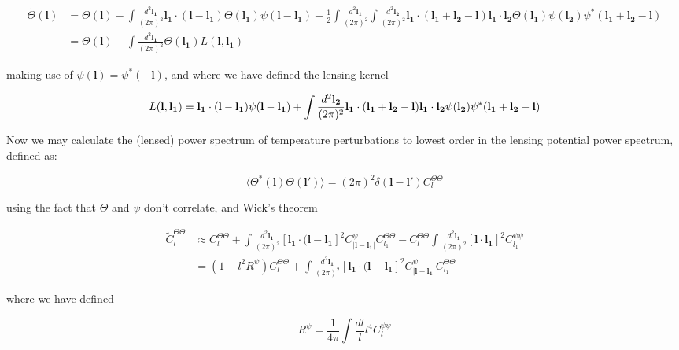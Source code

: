 \documentclass[a4paper,10pt]{article}
\renewcommand{\v}[1]{\mathbf{#1}}
\newcommand{\half}{\frac{1}{2}}
\newcommand{\finttwo}[1]{\int \frac{d^2 \v{#1}}{(2\pi)^2}}
\begin{document}
\begin{equation}\begin{split}
\tilde{\Theta}(\v{l}) &= \Theta(\v{l}) - \finttwo{l_1} \v{l_1}\cdot(\v{l}-\v{l_1})\Theta(\v{l_1})\psi(\v{l}-\v{l_1}) -\half \finttwo{l_1}\finttwo{l_2}\v{l_1}\cdot(\v{l_1}+\v{l_2}-\v{l})\v{l_1}\cdot\v{l_2}\Theta(\v{l_1})\psi(\v{l_2})\psi^*(\v{l_1}+\v{l_2}-\v{l})\\
&= \Theta(\v{l}) - \finttwo{l_1} \Theta(\v{l_1})L(\v{l},\v{l_1})
\label{lensedtemp}
\end{split}\end{equation}

making use of $\psi(\v{l})=\psi^*(-\v{l})$, and where we have defined the lensing kernel

\begin{equation}
L(\v{l},\v{l_1}) = \v{l_1}\cdot(\v{l}-\v{l_1})\psi(\v{l}-\v{l_1})+\finttwo{l_2}\v{l_1}\cdot(\v{l_1}+\v{l_2}-\v{l})\v{l_1}\cdot\v{l_2}\psi(\v{l_2})\psi^*(\v{l_1}+\v{l_2}-\v{l})\\
\end{equation}

Now we may calculate the (lensed) power spectrum of temperature perturbations to lowest order in the lensing potential power spectrum, defined as:

\begin{equation}
\langle \Theta^*(\v{l})\Theta(\v{l}')\rangle = (2\pi)^2\delta(\v{l}-\v{l}')C_l^{\Theta\Theta}
\end{equation}

using the fact that $\Theta$ and $\psi$ don't correlate, and Wick's theorem

\begin{equation}\begin{split}
\tilde{C}_l^{\Theta \Theta} &\approx C_l^{\Theta \Theta}+\finttwo{l_1}[ \v{l_1}\cdot(\v{l}-\v{l_1}]^2 C^\psi_{|\v{l}-\v{l_1}|}C_{l_1}^{\Theta\Theta} - C_l^{\Theta\Theta}\finttwo{l_1} [\v{l}\cdot\v{l_1}]^2C_{l_1}^{\psi\psi}\\
&=(1-l^2R^\psi)C_l^{\Theta\Theta}+\finttwo{l_1}[ \v{l_1}\cdot(\v{l}-\v{l_1}]^2 C^{\psi}_{|\v{l}-\v{l_1}|}C_{l_1}^{\Theta\Theta}
\end{split}\end{equation}

where we have defined

\begin{equation}
R^\psi = \frac{1}{4\pi}\int \frac{dl}{l} l^4 C_l^{\psi\psi}
\end{equation}
\end{document}
